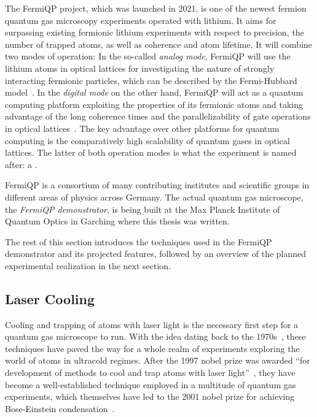 The FermiQP project, which was launched in 2021, is one of the newest fermion quantum gas microscopy experiments operated with lithium. It aims for surpassing existing fermionic lithium experiments with respect to precision, the number of trapped atoms, as well as coherence and atom lifetime. It will combine two modes of operation: In the so-called \textit{analog mode}, FermiQP will use the lithium atoms in optical lattices for investigating the nature of strongly interacting fermionic particles, which can be described by the Fermi-Hubbard model~\cite{hubbard_electron_1963, esslinger_fermi-hubbard_2010}. In the \textit{digital mode} on the other hand, FermiQP will act as a quantum computing platform exploiting the properties of its fermionic atoms and taking advantage of the long coherence times and the parallelizability of gate operations in optical lattices~\cite{zhang_functional_2022}. The key advantage over other platforms for quantum computing is the comparatively high scalability of quantum gases in optical lattices. The latter of both operation modes is what the experiment is named after: a .

FermiQP is a consortium of many contributing institutes and scientific groups in different areas of physics across Germany. The actual quantum gas microscope, the \textit{FermiQP demonstrator}, is being built at the Max Planck Institute of Quantum Optics in Garching where this thesis was written.

The rest of this section introduces the techniques used in the FermiQP demonstrator and its projected features, followed by an overview of the planned experimental realization in the next section.

\subsection*{Laser Cooling}\label{ch:laser_cooling}
Cooling and trapping of atoms with laser light is the necessary first step for a quantum gas microscope to run. With the idea dating back to the 1970s~\cite{hansch_cooling_1975}, these techniques have paved the way for a whole realm of experiments exploring the world of atoms in ultracold regimes. After the 1997 nobel prize was awarded ``for development of methods to cool and trap atoms with laser light''~\cite{noauthor_nobel_nodate}, they have become a well-established technique employed in a multitude of quantum gas experiments, which themselves have led to the 2001 nobel prize for achieving Bose-Einstein condensation~\cite{noauthor_nobel_nodate-1}.

